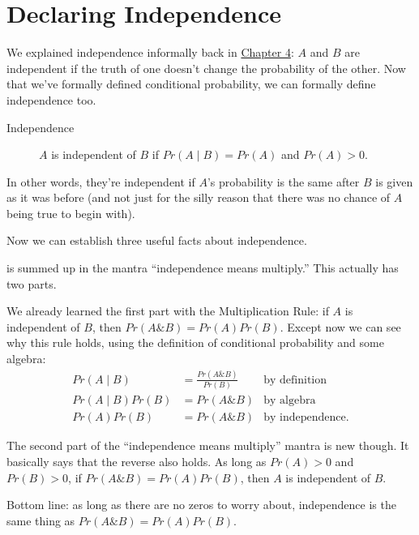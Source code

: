 \documentclass[justified]{tufte-book}
\newcommand{\given}{\mid}
\renewcommand{\wedge}{\mathbin{\&}}
\newcommand{\p}{Pr}
\theoremstyle{definition}
\theoremstyle{definition}
\theoremstyle{definition}
\theoremstyle{definition}
\theoremstyle{remark}
\begin{document}
\hypertarget{declaring-independence}{%
\section{Declaring Independence}\label{declaring-independence}}

We explained independence informally back in \protect\hyperlink{independence-1}{Chapter 4}: \(A\) and \(B\) are independent if the truth of one doesn't change the probability of the other. Now that we've formally defined conditional probability, we can formally define independence too.

\begin{description}
\item[Independence]
\(A\) is independent of \(B\) if \(\p(A \given B) = \p(A)\) and \(\p(A) > 0\).
\end{description}

In other words, they're independent if \(A\)'s probability is the same after \(B\) is given as it was before (and not just for the silly reason that there was no chance of \(A\) being true to begin with).

Now we can establish three useful facts about independence.

 is summed up in the mantra ``independence means multiply.'' This actually has two parts.

We already learned the first part with the Multiplication Rule: if \(A\) is independent of \(B\), then \(\p(A \wedge B) = \p(A)\p(B)\). Except now we can see why this rule holds, using the definition of conditional probability and some algebra:
\[
  \begin{aligned}
    \p(A \given B)      &= \frac{\p(A \wedge B)}{\p(B)} & \mbox{by definition}\\
    \p(A \given B)\p(B) &= \p(A \wedge B)               & \mbox{by algebra}\\
    \p(A)\p(B)          &= \p(A \wedge B)               & \mbox{by independence}.
  \end{aligned}
\]

The second part of the ``independence means multiply'' mantra is new though. It basically says that the reverse also holds. As long as \(\p(A) > 0\) and \(\p(B) > 0\), if \(\p(A \wedge B) = \p(A)\p(B)\), then \(A\) is independent of \(B\).

Bottom line: as long as there are no zeros to worry about, independence is the same thing as \(\p(A \wedge B) = \p(A)\p(B)\).
\end{document}
